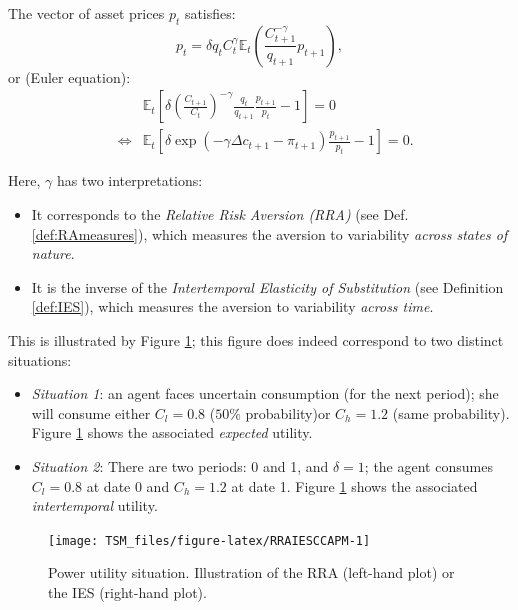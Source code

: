 \documentclass[
  12pt,
]{book}
\providecommand{\tightlist}{%
  \setlength{\itemsep}{0pt}\setlength{\parskip}{0pt}}
\theoremstyle{definition}
\theoremstyle{definition}
\theoremstyle{definition}
\theoremstyle{definition}
\theoremstyle{remark}
\begin{document}
The vector of asset prices \(p_t\) satisfies:
\[
p_t = \delta q_t C^\gamma_t \mathbb{E}_t \left(
\frac{C^{-\gamma}_{t+1}}{q_{t+1}} p_{t+1}
\right),
\]
or (Euler equation):
\begin{eqnarray}
&&\mathbb{E}_t\left[
\delta\left(
\frac{C_{t+1}}{C_t}
\right)^{-\gamma}  \frac{q_t}{q_{t+1}}
\frac{p_{t+1}}{p_t} - 1
\right] = 0 \label{eq:EulerCCAPM}\\
&\Leftrightarrow& \mathbb{E}_t\left[
\delta \exp(-\gamma \Delta c_{t+1} - \pi_{t+1})
\frac{p_{t+1}}{p_t} - 1
\right] = 0. \nonumber
\end{eqnarray}

Here, \(\gamma\) has two interpretations:

\begin{itemize}
\tightlist
\item
  It corresponds to the \emph{Relative Risk Aversion (RRA)} (see Def. \ref{def:RAmeasures}), which measures the aversion to variability \emph{across states of nature}.
\item
  It is the inverse of the \emph{Intertemporal Elasticity of Substitution} (see Definition \ref{def:IES}), which measures the aversion to variability \emph{across time}.
\end{itemize}

This is illustrated by Figure \ref{fig:RRAIESCCAPM}; this figure does indeed correspond to two distinct situations:

\begin{itemize}
\tightlist
\item
  \emph{Situation 1}: an agent faces uncertain consumption (for the next period); she will consume either \(C_l= 0.8\) (\(50\%\) probability)or \(C_h= 1.2\) (same probability). Figure \ref{fig:RRAIESCCAPM} shows the associated \emph{expected} utility.
\item
  \emph{Situation 2}: There are two periods: 0 and 1, and \(\delta=1\); the agent consumes \(C_l=0.8\) at date 0 and \(C_h=1.2\) at date 1. Figure \ref{fig:RRAIESCCAPM} shows the associated \emph{intertemporal} utility.
\end{itemize}

\begin{figure}
\texttt{[image: TSM\_files/figure-latex/RRAIESCCAPM-1]} \caption{Power utility situation. Illustration of the RRA (left-hand plot) or the IES (right-hand plot).}\label{fig:RRAIESCCAPM}
\end{figure}
\end{document}
